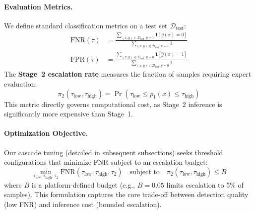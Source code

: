\paragraph{Evaluation Metrics.}
We define standard classification metrics on a test set $\mathcal{D}_{\text{test}}$:
\begin{align}
\mathrm{FNR}(\tau) &= \frac{\sum_{(x,y) \in \mathcal{D}_{\text{test}}: y=1} \mathbf{1}[\hat{y}(x) = 0]}{\sum_{(x,y) \in \mathcal{D}_{\text{test}}: y=1} 1} \label{eq:fnr} \\
\mathrm{FPR}(\tau) &= \frac{\sum_{(x,y) \in \mathcal{D}_{\text{test}}: y=0} \mathbf{1}[\hat{y}(x) = 1]}{\sum_{(x,y) \in \mathcal{D}_{\text{test}}: y=0} 1} \label{eq:fpr}
\end{align}
The \textbf{Stage~2 escalation rate} measures the fraction of samples requiring expert evaluation:
\begin{equation}
\pi_2(\tau_{\mathrm{low}},\tau_{\mathrm{high}}) = \Pr(\tau_{\mathrm{low}} \le p_1(x) \le \tau_{\mathrm{high}})
\end{equation}
\label{eq:escalation_rate}
This metric directly governs computational cost, as Stage~2 inference is significantly more expensive than Stage~1.

\paragraph{Optimization Objective.}
Our cascade tuning (detailed in subsequent subsections) seeks threshold configurations that minimize FNR subject to an escalation budget:
\begin{equation}
\min_{\tau_{\mathrm{low}},\tau_{\mathrm{high}},\tau_2} \mathrm{FNR}(\tau_{\mathrm{low}},\tau_{\mathrm{high}},\tau_2) \quad \text{subject to} \quad \pi_2(\tau_{\mathrm{low}},\tau_{\mathrm{high}}) \le B
\end{equation}
\label{eq:cascade_objective}
where $B$ is a platform\hyp defined budget (e.g., $B=0.05$ limits escalation to 5\% of samples). This formulation captures the core trade\hyp off between detection quality (low FNR) and inference cost (bounded escalation).

